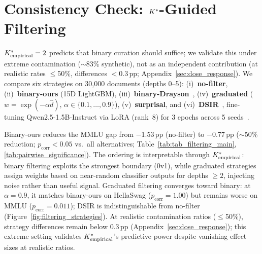 \section{Consistency Check: ${K^*}$-Guided Filtering}
\label{sec:filtering}

${K^*_{\text{empirical}}} = 2$ predicts that binary curation should suffice; we validate this under extreme contamination (${\sim}$83\% synthetic), not as an independent contribution (at realistic rates $\leq$50\%, differences $<$0.3\,pp; Appendix~\ref{sec:dose_response}).
We compare six strategies on 30{,}000 documents (depths 0--5): (i)~\textbf{no-filter}, (ii)~\textbf{binary-ours} (15D LightGBM), (iii)~\textbf{binary-Drayson}~\citep{drayson2025}, (iv)~\textbf{graduated} ($w = \exp(-\alpha \hat{d})$, $\alpha \in \{0.1,\ldots,0.9\}$), (v)~\textbf{surprisal}, and (vi)~\textbf{DSIR}~\citep{xie2023dsir}, fine-tuning Qwen2.5-1.5B-Instruct via LoRA (rank~8) for 3 epochs across 5 seeds~\cite{shumailov2024collapse, dohmatob2024model}.

\begin{table}[t]
\centering
\small
\caption{Downstream task performance (MMLU, HellaSwag) under six data-filtering strategies. Binary-ours uses the 15D LightGBM depth classifier; Graduated applies exponentially decaying weights $w = \exp(-\alpha \hat{d})$. Mean $\pm$ std over 5 seeds. Full $\alpha$ sweep in Figure~\ref{fig:filtering_strategies}.}
\label{tab:tab_filtering_main}
\resizebox{\columnwidth}{!}{}
\end{table}

Binary-ours reduces the MMLU gap from $-$1.53\,pp (no-filter) to $-$0.77\,pp (${\sim}$50\% reduction; $p_{\text{corr}} < 0.05$ vs.\ all alternatives; Table~\ref{tab:tab_filtering_main}, \ref{tab:pairwise_significance}).
The ordering is interpretable through ${K^*_{\text{empirical}}}$: binary filtering exploits the strongest boundary (0v1), while graduated strategies assign weights based on near-random classifier outputs for depths $\geq 2$, injecting noise rather than useful signal.
Graduated filtering converges toward binary: at $\alpha{=}0.9$, it matches binary-ours on HellaSwag ($p_{\text{corr}} = 1.00$) but remains worse on MMLU ($p_{\text{corr}} = 0.011$); DSIR is indistinguishable from no-filter (Figure~\ref{fig:filtering_strategies}).
At realistic contamination ratios ($\leq$50\%), strategy differences remain below 0.3\,pp (Appendix~\ref{sec:dose_response}); this extreme setting validates ${K^*_{\text{empirical}}}$'s predictive power despite vanishing effect sizes at realistic ratios.
